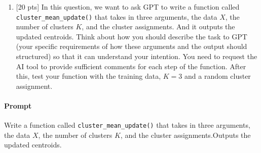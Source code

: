 \documentclass[
]{article}
\newenvironment{Shaded}{\begin{snugshade}}{\end{snugshade}}
\newcommand{\AttributeTok}[1]{\textcolor[rgb]{0.13,0.29,0.53}{#1}}
\newcommand{\CommentTok}[1]{\textcolor[rgb]{0.56,0.35,0.01}{\textit{#1}}}
\newcommand{\ConstantTok}[1]{\textcolor[rgb]{0.56,0.35,0.01}{#1}}
\newcommand{\DecValTok}[1]{\textcolor[rgb]{0.00,0.00,0.81}{#1}}
\newcommand{\FunctionTok}[1]{\textcolor[rgb]{0.13,0.29,0.53}{\textbf{#1}}}
\newcommand{\NormalTok}[1]{#1}
\newcommand{\OtherTok}[1]{\textcolor[rgb]{0.56,0.35,0.01}{#1}}
\newcommand{\SpecialCharTok}[1]{\textcolor[rgb]{0.81,0.36,0.00}{\textbf{#1}}}
\newcommand{\StringTok}[1]{\textcolor[rgb]{0.31,0.60,0.02}{#1}}
\providecommand{\tightlist}{%
  \setlength{\itemsep}{0pt}\setlength{\parskip}{0pt}}
\begin{document}
\begin{Shaded}
\end{Shaded}

\begin{enumerate}
\def\labelenumi{\alph{enumi}.}
\tightlist
\item
  {[}20 pts{]} In this question, we want to ask GPT to write a function
  called \texttt{cluster\_mean\_update()} that takes in three arguments,
  the data \(X\), the number of clusters \(K\), and the cluster
  assignments. And it outputs the updated centroids. Think about how you
  should describe the task to GPT (your specific requirements of how
  these arguments and the output should structured) so that it can
  understand your intention. You need to request the AI tool to provide
  sufficient comments for each step of the function. After this, test
  your function with the training data, \(K = 3\) and a random cluster
  assignment.
\end{enumerate}

\hypertarget{prompt}{%
\paragraph{Prompt}\label{prompt}}

Write a function called \texttt{cluster\_mean\_update()} that takes in
three arguments, the data \(X\), the number of clusters \(K\), and the
cluster assignments.Outputs the updated centroids.
\end{document}
